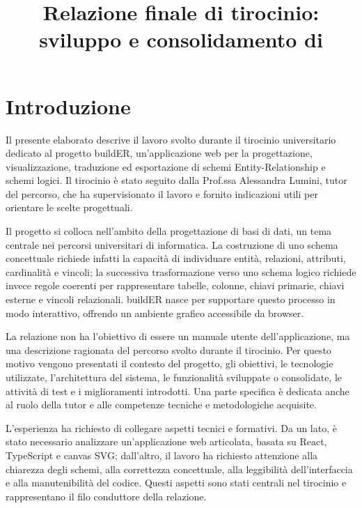 \documentclass{unipd-thesis-modern}
\title{Relazione finale di tirocinio:\\ sviluppo e consolidamento di \builder}
\author{\placeholder{Nome e cognome studente}}
\newcommand{\builder}{buildER}
\begin{document}

\makecover
\cleardoublepage

{\hypersetup{linkcolor=black}
\tableofcontents}
\cleardoublepage

\mainmatter

\chapter{Introduzione}

Il presente elaborato descrive il lavoro svolto durante il tirocinio universitario dedicato al progetto \builder, un'applicazione web per la progettazione, visualizzazione, traduzione ed esportazione di schemi Entity-Relationship e schemi logici. Il tirocinio è stato seguito dalla Prof.ssa Alessandra Lumini, tutor del percorso, che ha supervisionato il lavoro e fornito indicazioni utili per orientare le scelte progettuali.

Il progetto si colloca nell'ambito della progettazione di basi di dati, un tema centrale nei percorsi universitari di informatica. La costruzione di uno schema concettuale richiede infatti la capacità di individuare entità, relazioni, attributi, cardinalità e vincoli; la successiva trasformazione verso uno schema logico richiede invece regole coerenti per rappresentare tabelle, colonne, chiavi primarie, chiavi esterne e vincoli relazionali. \builder{} nasce per supportare questo processo in modo interattivo, offrendo un ambiente grafico accessibile da browser.

La relazione non ha l'obiettivo di essere un manuale utente dell'applicazione, ma una descrizione ragionata del percorso svolto durante il tirocinio. Per questo motivo vengono presentati il contesto del progetto, gli obiettivi, le tecnologie utilizzate, l'architettura del sistema, le funzionalità sviluppate o consolidate, le attività di test e i miglioramenti introdotti. Una parte specifica è dedicata anche al ruolo della tutor e alle competenze tecniche e metodologiche acquisite.

L'esperienza ha richiesto di collegare aspetti tecnici e formativi. Da un lato, è stato necessario analizzare un'applicazione web articolata, basata su React, TypeScript e canvas SVG; dall'altro, il lavoro ha richiesto attenzione alla chiarezza degli schemi, alla correttezza concettuale, alla leggibilità dell'interfaccia e alla manutenibilità del codice. Questi aspetti sono stati centrali nel tirocinio e rappresentano il filo conduttore della relazione.
\end{document}
